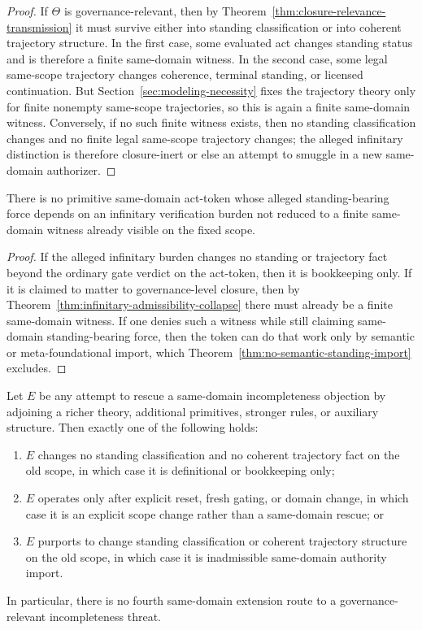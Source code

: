 \begin{proof}
If $\Theta$ is governance-relevant, then by Theorem~\ref{thm:closure-relevance-transmission} it must survive either into standing classification or into coherent trajectory structure. In the first case, some evaluated act changes standing status and is therefore a finite same-domain witness. In the second case, some legal same-scope trajectory changes coherence, terminal standing, or licensed continuation. But Section~\ref{sec:modeling-necessity} fixes the trajectory theory only for finite nonempty same-scope trajectories, so this is again a finite same-domain witness. Conversely, if no such finite witness exists, then no standing classification changes and no finite legal same-scope trajectory changes; the alleged infinitary distinction is therefore closure-inert or else an attempt to smuggle in a new same-domain authorizer.
\end{proof}

\begin{corollary}
There is no primitive same-domain act-token whose alleged standing-bearing force depends on an infinitary verification burden not reduced to a finite same-domain witness already visible on the fixed scope.
\end{corollary}

\begin{proof}
If the alleged infinitary burden changes no standing or trajectory fact beyond the ordinary gate verdict on the act-token, then it is bookkeeping only. If it is claimed to matter to governance-level closure, then by Theorem~\ref{thm:infinitary-admissibility-collapse} there must already be a finite same-domain witness. If one denies such a witness while still claiming same-domain standing-bearing force, then the token can do that work only by semantic or meta-foundational import, which Theorem~\ref{thm:no-semantic-standing-import} excludes.
\end{proof}

\begin{theorem}
\label{thm:same-domain-extension-trichotomy}
Let $E$ be any attempt to rescue a same-domain incompleteness objection by adjoining a richer theory, additional primitives, stronger rules, or auxiliary structure. Then exactly one of the following holds:
\begin{enumerate}
  \item $E$ changes no standing classification and no coherent trajectory fact on the old scope, in which case it is definitional or bookkeeping only;
  \item $E$ operates only after explicit reset, fresh gating, or domain change, in which case it is an explicit scope change rather than a same-domain rescue; or
  \item $E$ purports to change standing classification or coherent trajectory structure on the old scope, in which case it is inadmissible same-domain authority import.
\end{enumerate}
In particular, there is no fourth same-domain extension route to a governance-relevant incompleteness threat.
\end{theorem}

